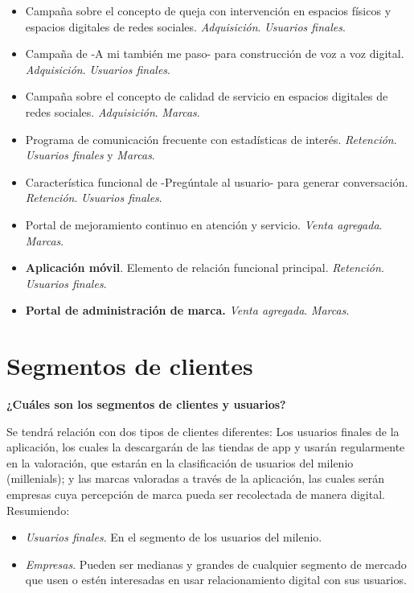 \begin{itemize}
    \item Campaña sobre el concepto de queja con intervención en espacios físicos y espacios digitales de redes sociales. \textit{Adquisición}. \textit{Usuarios finales}.
    \item Campaña de -A mi también me paso- para construcción de voz a voz digital. \textit{Adquisición}. \textit{Usuarios finales}.
    \item Campaña sobre el concepto de calidad de servicio en espacios digitales de redes sociales. \textit{Adquisición}. \textit{Marcas}.
    \item Programa de comunicación frecuente con estadísticas de interés. \textit{Retención}. \textit{Usuarios finales} y \textit{Marcas}.   
    \item Característica funcional de -Pregúntale al usuario- para generar conversación. \textit{Retención}. \textit{Usuarios finales}.
    \item Portal de mejoramiento continuo en atención y servicio. \textit{Venta agregada}. \textit{Marcas}.
    \item \textbf{Aplicación móvil}. Elemento de relación funcional principal. \textit{Retención}. \textit{Usuarios finales}.
    \item \textbf{Portal de administración de marca.} \textit{Venta agregada}. \textit{Marcas}.
    
\end{itemize}

\section{Segmentos de clientes}

\textbf{¿Cuáles son los segmentos de clientes y usuarios?}

Se tendrá relación con dos tipos de clientes diferentes: Los usuarios finales de la aplicación, los cuales la descargarán de las tiendas de app y usarán regularmente en la valoración, que estarán en la clasificación de usuarios del milenio (millenials); y las marcas valoradas a través de la aplicación, las cuales serán empresas cuya percepción de marca pueda ser recolectada de manera digital. Resumiendo:

\begin{itemize}
    \item \textit{Usuarios finales}. En el segmento de los usuarios del milenio. 
    \item \textit{Empresas}. Pueden ser medianas y grandes de cualquier segmento de mercado que usen o estén interesadas en usar relacionamiento digital con sus usuarios.
\end{itemize}

